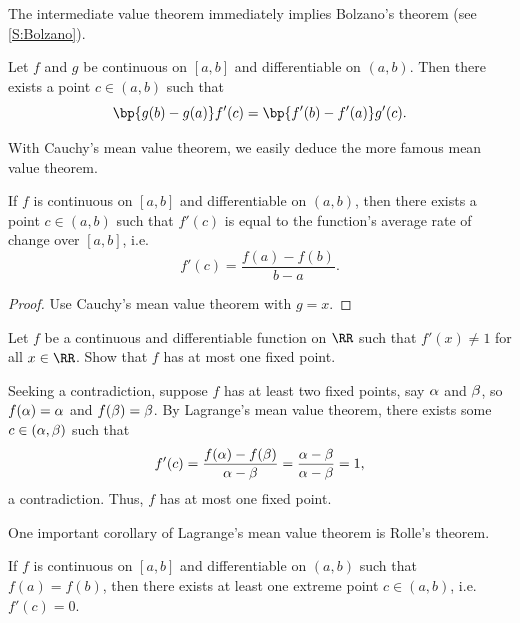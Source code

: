 The intermediate value theorem immediately implies Bolzano's theorem (see \SS\ref{S:Bolzano}).

\begin{theorem}
    Let $f$ and $g$ be continuous on $[a, b]$ and differentiable on $(a, b)$. Then there exists a point $c \in (a, b)$ such that \[\bp{g(b) - g(a)} f'(c) = \bp{f'(b) - f'(a)} g'(c).\]
\end{theorem}

With Cauchy's mean value theorem, we easily deduce the more famous mean value theorem.

\begin{theorem}
    If $f$ is continuous on $[a, b]$ and differentiable on $(a, b)$, then there exists a point $c \in (a, b)$ such that $f'(c)$ is equal to the function's average rate of change over $[a, b]$, i.e. \[f'(c) = \frac{f(a) - f(b)}{b-a}.\]
\end{theorem}
\begin{proof}
    Use Cauchy's mean value theorem with $g = x$.
\end{proof}

\begin{sample}
    Let $f$ be a continuous and differentiable function on $\RR$ such that $f'(x) \neq 1$ for all $x \in \RR$. Show that $f$ has at most one fixed point.
\end{sample}
\begin{sampans}
    Seeking a contradiction, suppose $f$ has at least two fixed points, say $\alpha$ and $\beta$, so $f(\alpha) = \alpha$ and $f(\beta) = \beta$. By Lagrange's mean value theorem, there exists some $c \in (\alpha, \beta)$ such that \[f'(c) = \frac{f(\alpha) - f(\beta)}{\alpha - \beta} = \frac{\alpha - \beta}{\alpha - \beta} = 1,\] a contradiction. Thus, $f$ has at most one fixed point.
\end{sampans}

One important corollary of Lagrange's mean value theorem is Rolle's theorem.

\begin{corollary}
    If $f$ is continuous on $[a, b]$ and differentiable on $(a, b)$ such that $f(a) = f(b)$, then there exists at least one extreme point $c \in (a, b)$, i.e. $f'(c) = 0$.
\end{corollary}